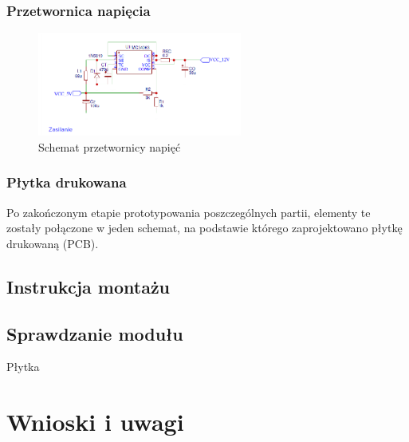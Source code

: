 \documentclass[12pt, eng, twoside, openany, final]{mgr}
\begin{document}
        \subsection{Przetwornica napięcia}
                \begin{figure}[H]
                \begin{center}
                    \includegraphics[width=0.6\textwidth]{psu.png}
                    \caption{Schemat przetwornicy napięć}
                \end{center}
                \end{figure}
        \subsection{Płytka drukowana}
            Po zakończonym etapie prototypowania poszczególnych partii, elementy te zostały połączone w jeden schemat, na podstawie którego zaprojektowano płytkę drukowaną (PCB). 
    \section{Instrukcja montażu}
    \section{Sprawdzanie modułu}
            Płytka 


%
%
\chapter{Wnioski i uwagi}
\thispagestyle{fancy}
  \cite{CleanCode,EffectiveModern,RpiBeginner}




\end{document}
